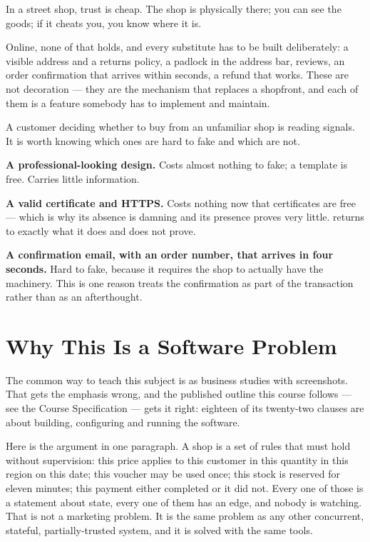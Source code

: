 In a street shop, trust is cheap. The shop is physically there; you can see the
goods; if it cheats you, you know where it is.

Online, none of that holds, and every substitute has to be built deliberately:
a visible address and a returns policy, a padlock in the address bar, reviews,
an order confirmation that arrives within seconds, a refund that works. These
are not decoration --- they are the mechanism that replaces a shopfront, and
each of them is a feature somebody has to implement and maintain.

\begin{examplebox}
A customer deciding whether to buy from an unfamiliar shop is reading signals.
It is worth knowing which ones are hard to fake and which are not.

\begin{tight}
  \item \textbf{A professional-looking design.} Costs almost nothing to fake;
        a template is free. Carries little information.
  \item \textbf{A valid certificate and HTTPS.} Costs nothing now that
        certificates are free --- which is why its absence is damning and its
        presence proves very little.  returns to exactly what
        it does and does not prove.
  \item \textbf{A confirmation email, with an order number, that arrives in
        four seconds.} Hard to fake, because it requires the shop to actually
        have the machinery. This is one reason  treats the
        confirmation as part of the transaction rather than as an
        afterthought.
\end{tight}
\end{examplebox}

\section{Why This Is a Software Problem}

The common way to teach this subject is as business studies with screenshots.
That gets the emphasis wrong, and the published outline this course follows ---
see the Course Specification --- gets it right: eighteen of its twenty-two
clauses are about building, configuring and running the software.

Here is the argument in one paragraph. A shop is a set of rules that must hold
without supervision: this price applies to this customer in this quantity in
this region on this date; this voucher may be used once; this stock is reserved
for eleven minutes; this payment either completed or it did not. Every one of
those is a statement about state, every one of them has an edge, and nobody is
watching. That is not a marketing problem. It is the same problem as any other
concurrent, stateful, partially-trusted system, and it is solved with the same
tools.

